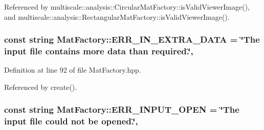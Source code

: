 Referenced by multiscale\-::analysis\-::\-Circular\-Mat\-Factory\-::is\-Valid\-Viewer\-Image(), and multiscale\-::analysis\-::\-Rectangular\-Mat\-Factory\-::is\-Valid\-Viewer\-Image().

\hypertarget{classmultiscale_1_1analysis_1_1MatFactory_a09459b632d5b01f184ce0f56245f5905}{
\subsubsection[{E\-R\-R\-\_\-\-I\-N\-\_\-\-E\-X\-T\-R\-A\-\_\-\-D\-A\-T\-A}]{\setlength{\rightskip}{0pt plus 5cm}const string Mat\-Factory\-::\-E\-R\-R\-\_\-\-I\-N\-\_\-\-E\-X\-T\-R\-A\-\_\-\-D\-A\-T\-A = \char`\"{}The input file contains more data than required.\char`\"{}\hspace{0.3cm}{\ttfamily [static]}, {\ttfamily [protected]}}}\label{classmultiscale_1_1analysis_1_1MatFactory_a09459b632d5b01f184ce0f56245f5905}


Definition at line 92 of file Mat\-Factory.\-hpp.



Referenced by create().

\hypertarget{classmultiscale_1_1analysis_1_1MatFactory_a06de250e466b41fcca4fa61a52a575fc}{
\subsubsection[{E\-R\-R\-\_\-\-I\-N\-P\-U\-T\-\_\-\-O\-P\-E\-N}]{\setlength{\rightskip}{0pt plus 5cm}const string Mat\-Factory\-::\-E\-R\-R\-\_\-\-I\-N\-P\-U\-T\-\_\-\-O\-P\-E\-N = \char`\"{}The input file could not be opened.\char`\"{}\hspace{0.3cm}{\ttfamily [static]}, {\ttfamily [protected]}}}\label{classmultiscale_1_1analysis_1_1MatFactory_a06de250e466b41fcca4fa61a52a575fc}


